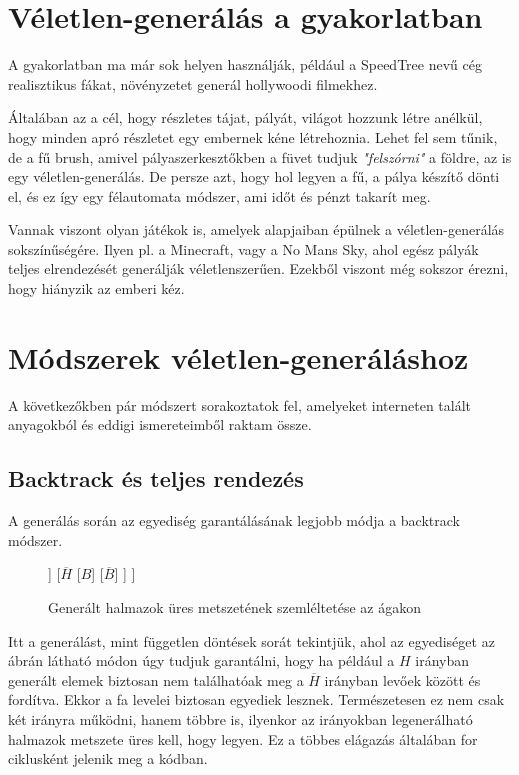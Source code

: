 \documentclass[12pt]{report}
\theoremstyle{definition}
\begin{document}
\section{Véletlen-generálás a gyakorlatban}
A gyakorlatban ma már sok helyen használják, például a SpeedTree nevű cég realisztikus fákat, növényzetet generál hollywoodi filmekhez.

Általában az a cél, hogy részletes tájat, pályát, világot hozzunk létre anélkül, hogy minden apró részletet egy embernek kéne létrehoznia. Lehet fel sem tűnik, de a fű brush, amivel pályaszerkesztőkben a füvet tudjuk \textit{"felszórni"} a földre, az is egy véletlen-generálás. De persze azt, hogy hol legyen a fű, a pálya készítő dönti el, és ez így egy félautomata módszer, ami időt és pénzt takarít meg.

Vannak viszont olyan játékok is, amelyek alapjaiban épülnek a véletlen-generálás sokszínűségére. Ilyen pl. a Minecraft, vagy a No Mans Sky, ahol egész pályák teljes elrendezését generálják véletlenszerűen. Ezekből viszont még sokszor érezni, hogy hiányzik az emberi kéz.

\section{Módszerek véletlen-generáláshoz}
A következőkben pár módszert sorakoztatok fel, amelyeket interneten talált anyagokból\cite{Mary} és eddigi ismereteimből raktam össze.

\pagebreak
\subsection{Backtrack és teljes rendezés}
A generálás során az egyediség garantálásának legjobb módja a backtrack módszer.
\begin{figure}[H]
\centering
\begin{forest}
[$Gen$
	[$H$
		[$A$]
		[$\overline{A}$]	
	]
	[$\overline{H}$
		[$B$]
		[$\overline{B}$]
	]
]
\end{forest}
\caption{\label{backtrack} Generált halmazok üres metszetének szemléltetése az ágakon}
\end{figure}
Itt a generálást, mint független döntések sorát tekintjük, ahol az egyediséget az ábrán látható módon úgy tudjuk garantálni, hogy ha például a $H$ irányban generált elemek biztosan nem találhatóak meg a $\overline{H}$ irányban levőek között és fordítva. Ekkor a fa levelei biztosan egyediek lesznek. Természetesen ez nem csak két irányra működni, hanem többre is, ilyenkor az irányokban legenerálható halmazok metszete üres kell, hogy legyen. Ez a többes elágazás általában for ciklusként jelenik meg a kódban.
\end{document}
